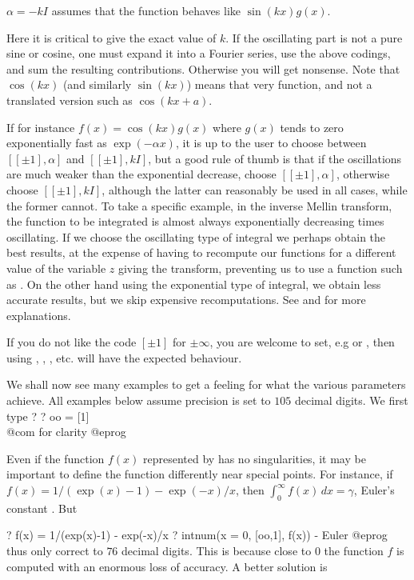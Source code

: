 \item $\alpha=-kI$ assumes that the function behaves like $\sin(kx)g(x)$.

\noindent Here it is critical to give the exact value of $k$. If the
oscillating part is not a pure sine or cosine, one must expand it into a
Fourier series, use the above codings, and sum the resulting contributions.
Otherwise you will get nonsense. Note that $\cos(kx)$ (and similarly
$\sin(kx)$) means that very function, and not a translated version such as
$\cos(kx+a)$.

If for instance $f(x)=\cos(kx)g(x)$ where $g(x)$ tends to zero exponentially
fast as $\exp(-\alpha x)$, it is up to the user to choose between
$[[\pm1],\alpha]$ and $[[\pm1],kI]$, but a good rule of thumb is that if the
oscillations are much weaker than the exponential decrease, choose
$[[\pm1],\alpha]$, otherwise choose $[[\pm1],kI]$, although the latter can
reasonably be used in all cases, while the former cannot. To take a specific
example, in the inverse Mellin transform, the function to be integrated is
almost always exponentially decreasing times oscillating. If we choose the
oscillating type of integral we perhaps obtain the best results, at the
expense of having to recompute our functions for a different value of the
variable $z$ giving the transform, preventing us to use a function such as
. On the other hand using the exponential type of
integral, we obtain less accurate results, but we skip expensive
recomputations. See  and  for more
explanations.

\smallskip
{} If you do not like the code $[\pm1]$ for $\pm\infty$, you
are welcome to set, e.g  or , then
using , , , etc. will have the expected
behaviour.

We shall now see many examples to get a feeling for what the various
parameters achieve. All examples below assume precision is set to $105$
decimal digits. We first type
\bprog
? 
? oo = [1]  \\@com for clarity
@eprog

 Even if the function $f(x)$ represented
by  has no singularities, it may be important to define the
function differently near special points. For instance, if $f(x) = 1
/(\exp(x)-1) - \exp(-x)/x$, then $\int_0^\infty f(x)\,dx=\gamma$, Euler's
constant . But

\bprog
? f(x) = 1/(exp(x)-1) - exp(-x)/x
? intnum(x = 0, [oo,1],  f(x)) - Euler
@eprog\noindent
thus only correct to $76$ decimal digits. This is because close to $0$ the
function $f$ is computed with an enormous loss of accuracy.
 A better solution is

